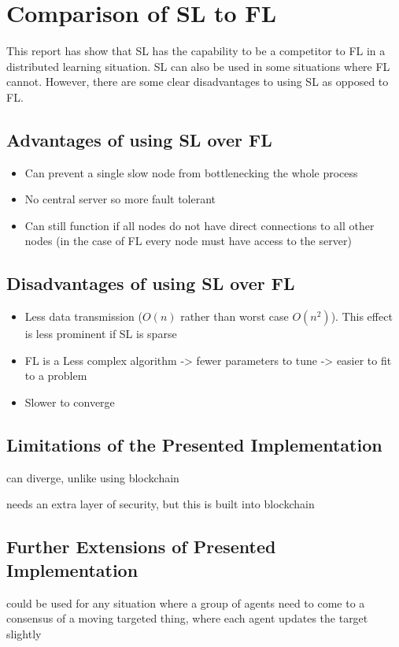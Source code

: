 \section{Comparison of SL to FL}

This report has show that SL has the capability to be a competitor to FL in a distributed learning situation. SL can also be used in some situations where FL cannot. However, there are some clear disadvantages to using SL as opposed to FL.

\subsection{Advantages of using SL over FL}

\begin{itemize}
	\item Can prevent a single slow node from bottlenecking the whole process
	\item No central server so more fault tolerant
	\item Can still function if all nodes do not have direct connections to all other nodes (in the case of FL every node must have access to the server)
\end{itemize}


\subsection{Disadvantages of using SL over FL}
\begin{itemize}
	\item Less data transmission ($O(n)$ rather than worst case $O(n^2)$). This effect is less prominent if SL is sparse
	\item FL is a Less complex algorithm -> fewer parameters to tune -> easier to fit to a problem
	\item Slower to converge
\end{itemize}


\subsection{Limitations of the Presented Implementation}
can diverge, unlike using blockchain

needs an extra layer of security, but this is built into blockchain

\subsection{Further Extensions of Presented Implementation}
could be used for any situation where a group of agents need to come to a consensus of a moving targeted thing, where each agent updates the target slightly